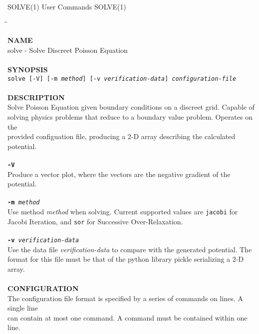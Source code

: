 \begin{flushleft}
	SOLVE(1)
	\hfill User Commands \hfill
	SOLVE(1)
\end{flushleft}

\begin{tabbing}
\hspace{30pt}\=\hspace{30pt}\=\kill

\textbf{NAME}\\
\> solve - Solve Discreet Poisson Equation\\
\\
\textbf{SYNOPSIS}\\
	\> \texttt{solve [-V] [-m \textit{method}] [-v \textit{verification-data}] \textit{configuration-file}}\\
	\\
\textbf{DESCRIPTION}\\
\> Solve Poisson Equation given boundary conditions on a discreet grid. Capable of\\
\> solving physics problems that reduce to a boundary value problem. Operates on the\\
\> provided configuation file, producing a 2-D array describing the calculated potential.\\
\\
\> \texttt{\textbf{-V}} \\
\> \> Produce a vector plot, where the vectors are the negative gradient of the potential.\\
\\
	\> \texttt{\textbf{-m} \textit{method}} \\
	\> \> Use method \textit{method} when solving. Current supported values are \texttt{jacobi} for\\
	\> \> Jacobi Iteration, and \texttt{sor} for Successive Over-Relaxation.\\
\\
	\> \texttt{\textbf{-v} \textit{verification-data}} \\
	\> \> Use the data file \textit{verification-data} to compare with the generated potential. The \\
	\> \> format for this file must be that of the python library pickle serializing a 2-D array.\\
\\
\textbf{CONFIGURATION}\\
\> The configuration file format is specified by a series of commands on lines. A single line\\
\> can contain at most one command. A command must be contained within one line.\\

\end{tabbing}
